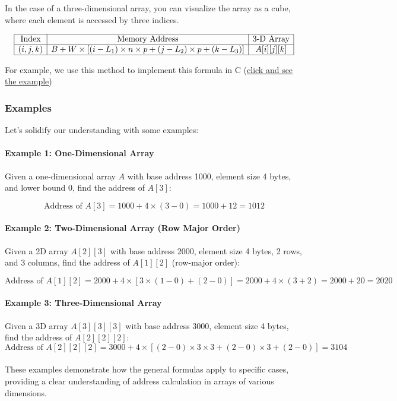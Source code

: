 \documentclass{book}
\begin{document}
In the case of a three-dimensional array, you can visualize the array as a cube, where each element is accessed by three indices.

\[
\begin{array}{|c|c|c|}
	\hline
	\text{Index} & \text{Memory Address} & \text{3-D Array} \\
	\hline
	(i, j, k) & B + W \times \left[ (i - L_1) \times n \times p + (j - L_2) \times p + (k - L_3) \right] & A[i][j][k] \\
	\hline
\end{array}
\]

For example, we use this method to implement this formula in C (\href{https://github.com/m-mdy-m/Arliz/blob/main/AddressCalculation/4D-Dimensional.c}{click and see the example})

\subsubsection{Examples}

Let’s solidify our understanding with some examples:

\paragraph{Example 1: One-Dimensional Array}
Given a one-dimensional array \( A \) with base address 1000, element size 4 bytes, and lower bound 0, find the address of \( A[3] \):

\[
\text{Address of } A[3] = 1000 + 4 \times (3 - 0) = 1000 + 12 = 1012
\]

\paragraph{Example 2: Two-Dimensional Array (Row Major Order)}
Given a 2D array \( A[2][3] \) with base address 2000, element size 4 bytes, 2 rows, and 3 columns, find the address of \( A[1][2] \) (row-major order):

\[
\text{Address of } A[1][2] = 2000 + 4 \times \left[ 3 \times (1 - 0) + (2 - 0) \right] = 2000 + 4 \times (3 + 2) = 2000 + 20 = 2020
\]

\paragraph{Example 3: Three-Dimensional Array}
Given a 3D array \( A[3][3][3] \) with base address 3000, element size 4 bytes, find the address of \( A[2][2][2] \):
\[\text{Address of } A[2][2][2] = 3000 + 4 \times \left[ (2 - 0) \times 3 \times 3 + (2 - 0) \times 3 + (2 - 0) \right] = 3104\]\\
These examples demonstrate how the general formulas apply to specific cases, providing a clear understanding of address calculation in arrays of various dimensions.
\end{document}
